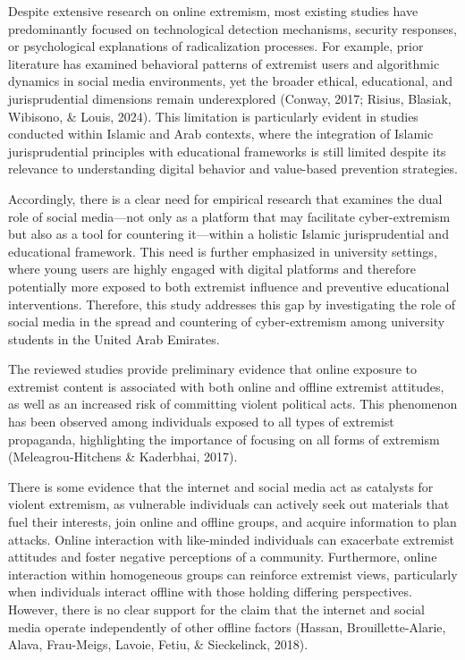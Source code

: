 \documentclass[10pt]{NSP1}
\begin{document}
Despite extensive research on online extremism, most existing studies have predominantly focused on technological detection mechanisms, security responses, or psychological explanations of radicalization processes. For example, prior literature has examined behavioral patterns of extremist users and algorithmic dynamics in social media environments, yet the broader ethical, educational, and jurisprudential dimensions remain underexplored (Conway, 2017; Risius, Blasiak, Wibisono, \& Louis, 2024). This limitation is particularly evident in studies conducted within Islamic and Arab contexts, where the integration of Islamic jurisprudential principles with educational frameworks is still limited despite its relevance to understanding digital behavior and value-based prevention strategies.

Accordingly, there is a clear need for empirical research that examines the dual role of social media—not only as a platform that may facilitate cyber-extremism but also as a tool for countering it—within a holistic Islamic jurisprudential and educational framework. This need is further emphasized in university settings, where young users are highly engaged with digital platforms and therefore potentially more exposed to both extremist influence and preventive educational interventions. Therefore, this study addresses this gap by investigating the role of social media in the spread and countering of cyber-extremism among university students in the United Arab Emirates.

The reviewed studies provide preliminary evidence that online exposure to extremist content is associated with both online and offline extremist attitudes, as well as an increased risk of committing violent political acts. This phenomenon has been observed among individuals exposed to all types of extremist propaganda, highlighting the importance of focusing on all forms of extremism (Meleagrou-Hitchens \& Kaderbhai, 2017).

There is some evidence that the internet and social media act as catalysts for violent extremism, as vulnerable individuals can actively seek out materials that fuel their interests, join online and offline groups, and acquire information to plan attacks. Online interaction with like-minded individuals can exacerbate extremist attitudes and foster negative perceptions of a community. Furthermore, online interaction within homogeneous groups can reinforce extremist views, particularly when individuals interact offline with those holding differing perspectives. However, there is no clear support for the claim that the internet and social media operate independently of other offline factors (Hassan, Brouillette-Alarie, Alava, Frau-Meigs, Lavoie, Fetiu, \& Sieckelinck, 2018).
\end{document}
